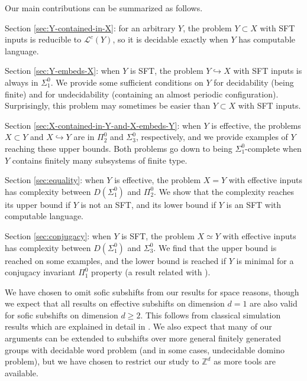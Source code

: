 \documentclass[a4paper]{article}
\newcommand{\Le}{\mathcal{L}}
\theoremstyle{definition}
\begin{document}
Our main contributions can be summarized as follows.
\begin{description}
\item Section \ref{sec:Y-contained-in-X}: for an arbitrary $Y$, the problem $Y\subset X$ with SFT inputs is reducible to $\Le^c(Y)$, so it is decidable exactly when $Y$ has computable language. 
\item Section \ref{sec:Y-embeds-X}: when $Y$ is SFT, the problem $Y\hookrightarrow X$ with SFT inputs is always in $\Sigma_1^0$. We provide some sufficient conditions on $Y$ for decidability (being finite) and for undecidability (containing an almost periodic configuration). Surprisingly, this problem may sometimes be easier than $Y\subset X$ with SFT inputs.
\item Section \ref{sec:X-contained-in-Y-and-X-embeds-Y}: when $Y$ is effective, the problems $X\subset Y$ and $X\hookrightarrow Y$ are in $\Pi^0_2$ and $\Sigma^0_3$, respectively, and we provide examples of $Y$ reaching these upper bounds. Both problems go down to being $\Sigma^0_1$-complete when $Y$ contains finitely many subsystems of finite type.
\item Section \ref{sec:equality}: when $Y$ is effective, the problem $X=Y$ with effective inputs has complexity between $D(\Sigma_1^0)$ and $\Pi_2^0$. We show that the complexity reaches its upper bound if $Y$ is not an SFT, and its lower bound if $Y$ is an SFT with computable language.
\item Section \ref{sec:conjugacy}: when $Y$ is SFT, the problem $X\simeq Y$ with effective inputs has complexity between $D(\Sigma_1^0)$ and $\Sigma_3^0$. We find that the upper bound is reached on some examples, and the lower bound is reached if $Y$ is minimal for a conjugacy invariant $\Pi_1^0$ property (a result related with \cite{amir_minimality_2025}).
\end{description}

We have chosen to omit sofic subshifts from our results for space reasons, though we expect that all results on effective subshifts on dimension $d=1$ are also valid for sofic subshifts on dimension $d\geq 2$. This follows from classical simulation results \cite{aubrun2013simulation,durand_effective_2010} which are explained in detail in \cite[Section 1.3]{jeandel_hardness_2015}. We also expect that many of our arguments can be extended to subshifts over more general finitely generated groups with decidable word problem (and in some cases, undecidable domino problem), but we have chosen to restrict our study to $\mathbb{Z}^d$ as more tools are available.    
\end{document}
